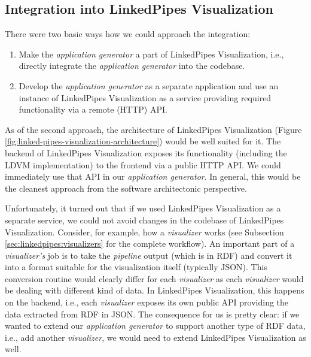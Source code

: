 \subsection{Integration into LinkedPipes Visualization}

There were two basic ways how we could approach the integration:

\begin{enumerate}
\item Make the \emph{application generator} a part of LinkedPipes Visualization, i.e., directly integrate the \emph{application generator} into the codebase.
\item Develop the \emph{application generator} as a separate application and use an instance of LinkedPipes Visualization as a service providing required functionality via a remote (HTTP) API.
\end{enumerate}

As of the second approach, the architecture of LinkedPipes Visualization (Figure \ref{fig:linked-pipes-visualization-architecture}) would be well suited for it. The backend of LinkedPipes Visualization exposes its functionality (including the LDVM implementation) to the frontend via a public HTTP API. We could immediately use that API in our \emph{application generator}. In general, this would be the cleanest approach from the software architectonic perspective.

Unfortunately, it turned out that if we used LinkedPipes Visualization as a separate service, we could not avoid changes in the codebase of LinkedPipes Visualization. Consider, for example, how a \emph{visualizer} works (see Subsection \ref{sec:linkedpipes:visualizers} for the complete workflow). An important part of a \emph{visualizer's} job is to take the \emph{pipeline} output (which is in RDF) and convert it into a format suitable for the visualization itself (typically JSON). This conversion routine would clearly differ for each \emph{visualizer} as each \emph{visualizer} would be dealing with different kind of data. In LinkedPipes Visualization, this happens on the backend, i.e., each \emph{visualizer} exposes its own public API providing the data extracted from RDF in JSON. The consequence for us is pretty clear: if we wanted to extend our \emph{application generator} to support another type of RDF data, i.e., add another \emph{visualizer}, we would need to extend LinkedPipes Visualization as well. 

